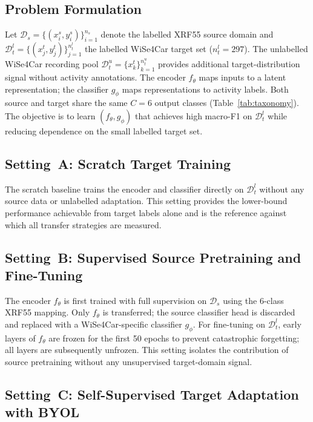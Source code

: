 \documentclass[english,bibtex]{kththesis}
\begin{document}
\subsection{Problem Formulation}
\label{sec:formulation}

Let $\mathcal{D}_s = \{(x_i^s, y_i^s)\}_{i=1}^{n_s}$ denote the labelled XRF55 source domain and $\mathcal{D}_t^l = \{(x_j^t, y_j^t)\}_{j=1}^{n_t^l}$ the labelled WiSe4Car target set ($n_t^l = 297$). The unlabelled WiSe4Car recording pool $\mathcal{D}_t^u = \{x_k^t\}_{k=1}^{n_t^u}$ provides additional target-distribution signal without activity annotations. The encoder $f_\theta$ maps inputs to a latent representation; the classifier $g_\phi$ maps representations to activity labels. Both source and target share the same $C = 6$ output classes (Table~\ref{tab:taxonomy}). The objective is to learn $(f_\theta, g_\phi)$ that achieves high macro-F1 on $\mathcal{D}_t^l$ while reducing dependence on the small labelled target set.

\subsection{Setting~A: Scratch Target Training}
\label{sec:scratch}

The scratch baseline trains the encoder and classifier directly on $\mathcal{D}_t^l$ without any source data or unlabelled adaptation. This setting provides the lower-bound performance achievable from target labels alone and is the reference against which all transfer strategies are measured.

\subsection{Setting~B: Supervised Source Pretraining and Fine-Tuning}
\label{sec:supervisedtransfer}

The encoder $f_\theta$ is first trained with full supervision on $\mathcal{D}_s$ using the 6-class XRF55 mapping. Only $f_\theta$ is transferred; the source classifier head is discarded and replaced with a WiSe4Car-specific classifier $g_\phi$. For fine-tuning on $\mathcal{D}_t^l$, early layers of $f_\theta$ are frozen for the first 50 epochs to prevent catastrophic forgetting; all layers are subsequently unfrozen. This setting isolates the contribution of source pretraining without any unsupervised target-domain signal.

\subsection{Setting~C: Self-Supervised Target Adaptation with BYOL}
\label{sec:ssl_adapt}
\end{document}
